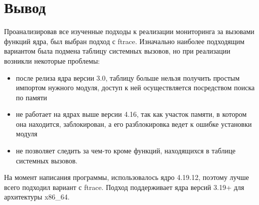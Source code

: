 \section{Вывод}
Проанализировав все изученные подходы к реализации мониторинга за вызовами функций ядра, был выбран подход с ftrace. Изначально наиболее подходящим вариантом была подмена таблицу системных вызовов, но при реализации возникли некоторые проблемы:
\begin{itemize}
	\item после релиза ядра версии 3.0, таблицу больше нельзя получить простым импортом нужного модуля, доступ к ней осуществляется посредством поиска по памяти
	\item не работает на ядрах выше версии 4.16, так как участок памяти, в котором она находится, заблокирован, а его разблокировка ведет к ошибке установки модуля
	\item не позволяет следить за чем-то кроме функций, находящихся в таблице системных вызовов.
\end{itemize}
На момент написания программы, использовалось ядро 4.19.12, поэтому лучше всего подходил вариант с ftrace. Подход поддерживает ядра версий 3.19+ для архитектуры x86\_64.

